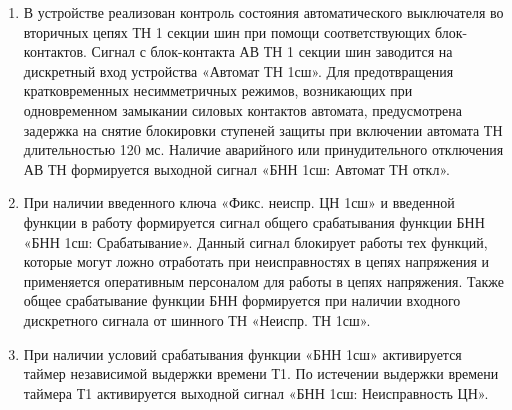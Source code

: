 \begin{enumerate}
Уставкой SGF5 осуществляется ввод в работу контроля утроенного напряжения НП третьей гармоники который отслеживает обрыв в цепях «разомкнутого треугольника». Срабатывание ИО информируется сигналом ИО «3U03f», реагирующим на снижение уровня напряжения третьей гармоники в цепях «разомкнутого треугольника» ниже уставки. В данном случае учитывается тот факт, что даже в обычном режиме работы из-за нелинейности ТН в схемах «разомкнутого треугольника» наблюдается заметный уровень третьей гармоники, составляющий около 0,5 В. При обрыве, уровень третьей гармоники значительно снижается, теоретически приближаясь к нулю. Для исключения ложного срабатывания в нормальных и аварийных режимах, не связанных с неисправностью в цепях «разомкнутого треугольника» выполнен контроль уровня минимального напряжения и контроль напряжения ОП и по истечении времени нерегулируемой выдержки времени таймера Т4 формируется выходной сигнал пуска «БНН 1сш: Пуск 3U03f». При наличии пусковых условий данного алгоритма, по истечении выдержки времени таймера Т1 формируется сигнал неисправности в цепях напряжения ТН «БННш: Неисправность ЦН». При выявлении неисправностей в цепях «разомкнутого треугольника» формируется блокирующий сигнал для дистанционной защиты.
\item
В устройстве реализован контроль состояния автоматического выключателя во вторичных цепях ТН 1 секции шин при помощи соответствующих блок-контактов. Сигнал с блок-контакта АВ ТН 1 секции шин заводится на дискретный вход устройства «Автомат ТН 1сш». Для предотвращения кратковременных несимметричных режимов, возникающих при одновременном замыкании силовых контактов автомата, предусмотрена задержка на снятие блокировки ступеней защиты при включении автомата ТН длительностью 120 мс. Наличие аварийного или принудительного отключения АВ ТН формируется выходной сигнал «БНН 1сш: Автомат ТН откл».
\item
При наличии введенного ключа «Фикс. неиспр. ЦН 1сш» и введенной функции в работу формируется сигнал общего срабатывания функции БНН «БНН 1сш: Срабатывание». Данный сигнал блокирует работы тех функций, которые могут ложно отработать при неисправностях в цепях напряжения и применяется оперативным персоналом для работы в цепях напряжения. Также общее срабатывание функции БНН формируется при наличии входного дискретного сигнала от шинного ТН «Неиспр. ТН 1сш».
\item
При наличии условий срабатывания функции «БНН 1сш» активируется таймер независимой выдержки времени Т1. По истечении выдержки времени таймера Т1 активируется выходной сигнал «БНН 1сш: Неисправность ЦН».


\end{enumerate}
